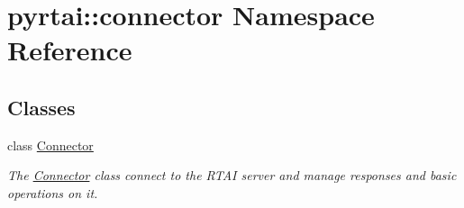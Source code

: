 \hypertarget{namespacepyrtai_1_1connector}{
\section{pyrtai\-:\-:connector \-Namespace \-Reference}
\label{namespacepyrtai_1_1connector}
}
\subsection*{\-Classes}
\begin{DoxyCompactItemize}
\item 
class \hyperlink{classpyrtai_1_1connector_1_1_connector}{\-Connector}
\begin{DoxyCompactList}\small\item\em \-The \hyperlink{classpyrtai_1_1connector_1_1_connector}{\-Connector} class connect to the \-R\-T\-A\-I server and manage responses and basic operations on it. \end{DoxyCompactList}\end{DoxyCompactItemize}
